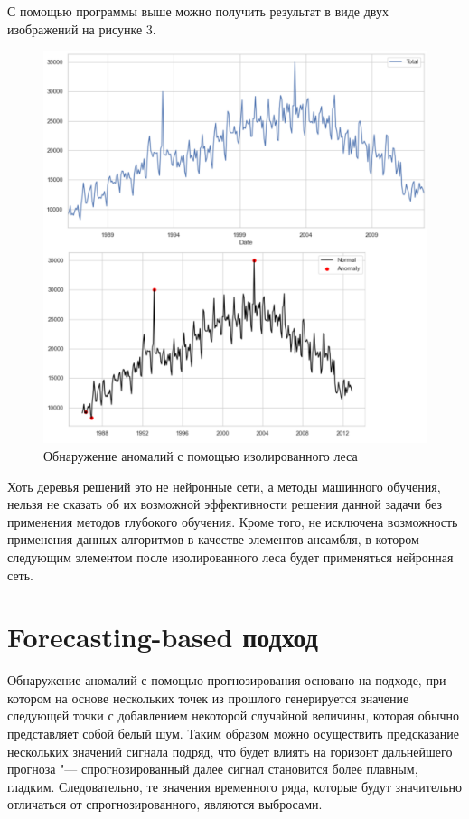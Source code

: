\documentclass[bachelor, och, referat]{../shiza}
\begin{document}
        С помощью программы выше можно получить результат в виде двух
        изображений на рисунке 3.

        \begin{figure}[H]
            \centering
            \includegraphics[width=1\textwidth]{pic/forest.png}
            \caption{Обнаружение аномалий с помощью изолированного леса}
        \end{figure}
    
        Хоть деревья решений это не нейронные сети, а методы машинного обучения,
        нельзя не сказать об их возможной эффективности решения данной задачи
        без применения методов глубокого обучения. Кроме того, не исключена
        возможность применения данных алгоритмов в качестве элементов ансамбля,
        в котором следующим элементом после изолированного леса будет
        применяться нейронная сеть.
    
\section{Forecasting-based подход}
    
        Обнаружение аномалий с помощью прогнозирования основано на подходе, при
        котором на основе нескольких точек из прошлого генерируется значение
        следующей точки с добавлением некоторой случайной величины, которая
        обычно представляет собой белый шум. Таким образом можно осуществить
        предсказание нескольких значений сигнала подряд, что будет влиять на
        горизонт дальнейшего прогноза "--- спрогнозированный далее сигнал
        становится более плавным, гладким. Следовательно, те значения временного
        ряда, которые будут значительно отличаться от спрогнозированного,
        являются выбросами.
\end{document}
